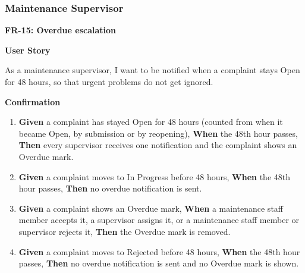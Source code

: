 \subsubsection*{Maintenance Supervisor}

\noindent\textbf{FR-15: Overdue escalation}\par\nopagebreak[4]\smallskip
\noindent\textbf{User Story}\par\nopagebreak[4]
\noindent As a maintenance supervisor, I want to be notified when a complaint stays Open for 48 hours, so that urgent problems do not get ignored.\par\smallskip
{\makeatletter
{}
\makeatother
\noindent\textbf{Confirmation}\par\nopagebreak[4]\vspace{-6pt}\nopagebreak[4]
\begin{enumerate}\setlength{\itemsep}{2pt}\setlength{\parsep}{0pt}\setlength{\topsep}{2pt}\setlength{\partopsep}{0pt}
  \item \textbf{Given} a complaint has stayed Open for 48 hours (counted from when it became Open, by submission or by reopening), \textbf{When} the 48th hour passes, \textbf{Then} every supervisor receives one notification and the complaint shows an Overdue mark.
  \item \textbf{Given} a complaint moves to In Progress before 48 hours, \textbf{When} the 48th hour passes, \textbf{Then} no overdue notification is sent.
  \item \textbf{Given} a complaint shows an Overdue mark, \textbf{When} a maintenance staff member accepts it, a supervisor assigns it, or a maintenance staff member or supervisor rejects it, \textbf{Then} the Overdue mark is removed.
  \item \textbf{Given} a complaint moves to Rejected before 48 hours, \textbf{When} the 48th hour passes, \textbf{Then} no overdue notification is sent and no Overdue mark is shown.
\end{enumerate}}
\medskip
 
